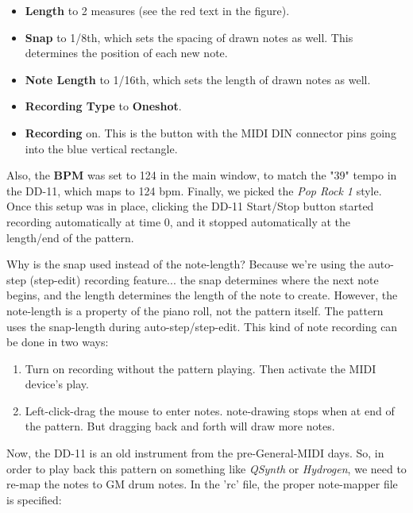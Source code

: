    \begin{itemize}
      \item \textbf{Length} to 2 measures (see the red text in the figure).
      \item \textbf{Snap} to 1/8th, which sets the spacing of drawn notes as
         well.  This determines the position of each new note.
      \item \textbf{Note Length} to 1/16th, which sets the length of drawn
         notes as well.
      \item \textbf{Recording Type} to \textbf{Oneshot}.
      \item \textbf{Recording} on. This is the button with the MIDI DIN
         connector pins going into the blue vertical rectangle.
   \end{itemize}

   Also, the \textbf{BPM} was set to 124 in the main
   window, to match the "39" tempo in the DD-11, which maps to 124 bpm.
   Finally, we picked the \textsl{Pop Rock 1} style.  
   Once this setup was in place, clicking the DD-11 Start/Stop button started
   recording automatically at time 0, and it stopped automatically at the
   length/end of the pattern.

   Why is the snap used instead of the note-length?  Because we're using the
   auto-step (step-edit) recording feature...
   the snap determines where the next note
   begins, and the length determines the length of the note to create.
   However, the note-length is a property of the piano roll, not the pattern
   itself.  The pattern uses the snap-length during auto-step/step-edit.
   This kind of note recording can be done in two ways:

   \begin{enumerate}
      \item Turn on recording without the pattern playing.
         Then activate the MIDI device's play.
      \item Left-click-drag the mouse to enter notes.
         note-drawing stops when at end of the pattern.
         But dragging back and forth will draw more notes.
   \end{enumerate}

   Now, the DD-11 is an old instrument from the pre-General-MIDI days.
   So, in order to play back this pattern on something like
   \textsl{QSynth} or \textsl{Hydrogen}, we need to re-map the notes to GM drum
   notes.  In the 'rc' file, the proper note-mapper file is specified:

